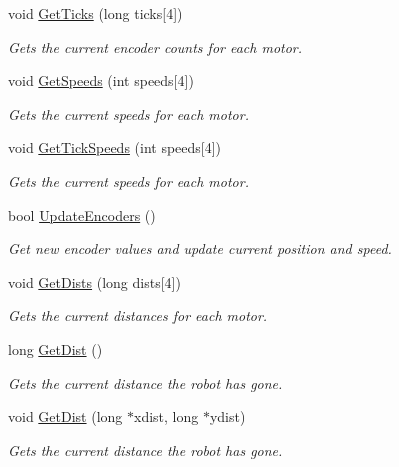 \begin{DoxyCompactItemize}
void \hyperlink{classRover5_aebefb7947f7f6a76c705b23124771d95}{Get\-Ticks} (long ticks\mbox{[}4\mbox{]})
\begin{DoxyCompactList}\small\item\em Gets the current encoder counts for each motor. \end{DoxyCompactList}\item 
void \hyperlink{classRover5_a7342a606f85727c43824fa0a6da67bb2}{Get\-Speeds} (int speeds\mbox{[}4\mbox{]})
\begin{DoxyCompactList}\small\item\em Gets the current speeds for each motor. \end{DoxyCompactList}\item 
void \hyperlink{classRover5_abd4ade4ebc8db92e53e56df7e8f6f828}{Get\-Tick\-Speeds} (int speeds\mbox{[}4\mbox{]})
\begin{DoxyCompactList}\small\item\em Gets the current speeds for each motor. \end{DoxyCompactList}\item 
bool \hyperlink{classRover5_a052241d5d85cef3430352f58aae6d3f0}{Update\-Encoders} ()
\begin{DoxyCompactList}\small\item\em Get new encoder values and update current position and speed. \end{DoxyCompactList}\item 
void \hyperlink{classRover5_aa5434eb305b6f5b04b11dc45a23e43fa}{Get\-Dists} (long dists\mbox{[}4\mbox{]})
\begin{DoxyCompactList}\small\item\em Gets the current distances for each motor. \end{DoxyCompactList}\item 
long \hyperlink{classRover5_a6f8505655d182d3fdc97a3829523d2a6}{Get\-Dist} ()
\begin{DoxyCompactList}\small\item\em Gets the current distance the robot has gone. \end{DoxyCompactList}\item 
void \hyperlink{classRover5_abdbaf08ebd97ce8266ffaf406324b830}{Get\-Dist} (long $\ast$xdist, long $\ast$ydist)
\begin{DoxyCompactList}\small\item\em Gets the current distance the robot has gone. \end{DoxyCompactList}\item 

\end{DoxyCompactItemize}
